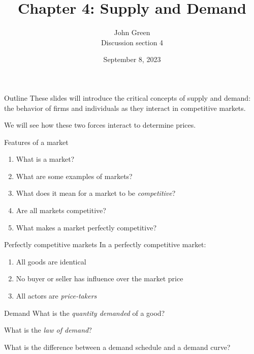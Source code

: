 \documentclass[aspectratio=169]{beamer}
\title{Chapter 4: Supply and Demand}
\author{John Green \\
    Discussion section 4}
\date{September 8, 2023}
\begin{document}
\begin{frame}
    \titlepage 
\end{frame}

\begin{frame}{Outline}
    These slides will introduce the critical concepts of supply and demand: the behavior of firms and individuals as they interact in competitive markets.
    
    \medskip

    We will see how these two forces interact to determine prices.
\end{frame}

\begin{frame}{Features of a market}
    \begin{enumerate}
        \item What is a market?
        \item What are some examples of markets?
        \item What does it mean for a market to be \textit{competitive}?
        \item Are all markets competitive?
        \item What makes a market perfectly competitive?
    \end{enumerate}
\end{frame}

\begin{frame}{Perfectly competitive markets}
    In a perfectly competitive market:
    \begin{enumerate}
        \item All goods are identical
        \item No buyer or seller has influence over the market price
        \item All actors are \textit{price-takers}
    \end{enumerate}
\end{frame}

\begin{frame}{Demand}
    What is the \textit{quantity demanded} of a good?

    \medskip

    What is the \textit{law of demand}?

    \medskip

    What is the difference between a demand schedule and a demand curve?

\end{frame} 
\end{document}
